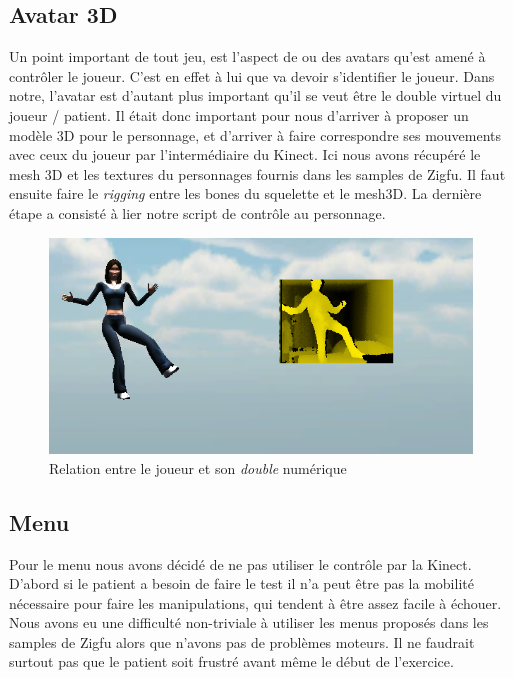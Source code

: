 \subsection{Avatar 3D}   
Un point important de tout jeu, est l'aspect de ou des avatars qu'est amené à contrôler le joueur. C'est en effet à lui que va devoir s'identifier le joueur. Dans notre, l'avatar est d'autant plus important qu'il se veut être le double virtuel du joueur / patient. Il était donc important pour nous d'arriver à proposer un modèle 3D pour le personnage, et d'arriver à faire correspondre ses mouvements avec ceux du joueur par l'intermédiaire du Kinect. Ici nous avons récupéré le mesh 3D et les textures du personnages fournis dans les samples de Zigfu. Il faut ensuite faire le \textit{rigging} entre les bones du squelette et le mesh3D. La dernière étape a consisté à lier notre script de contrôle au personnage.
\begin{figure}
\begin{center}
  \includegraphics[scale=1]{images/avatar3D.png} \caption{Relation entre le joueur et son \textit{double} numérique}
\end{center}
\end{figure}

    
\subsection{Menu}

Pour le menu nous avons décidé de ne pas utiliser le contrôle par la Kinect.
D'abord si le patient a besoin de faire le test il n'a peut être pas la
mobilité nécessaire pour faire les manipulations, qui tendent à être assez 
facile à échouer. Nous avons eu une difficulté non-triviale à utiliser les menus
proposés dans les samples de Zigfu alors que n'avons pas de problèmes moteurs.
Il ne faudrait surtout pas que le patient soit frustré avant même le début de
l'exercice.
    
